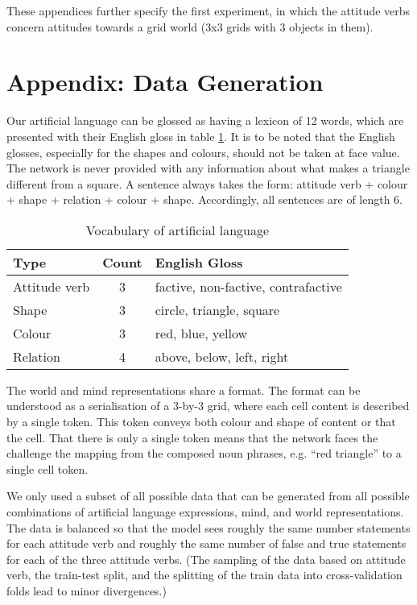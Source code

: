 \documentclass[a4paper]{article}
\begin{document}
These appendices further specify the first experiment, in which the
attitude verbs concern attitudes towards a grid world (3x3 grids with 3
objects in them).

\section{Appendix: Data Generation}

Our artificial language can be glossed as having a lexicon of 12 words, which are presented with their English gloss in table \ref{tab:artifical_vocabulary}. It is to be noted that the English glosses, especially for the shapes and colours, should not be taken at face value. The network is never provided with any information about what makes a triangle different from a square. A sentence always takes the form: attitude verb + colour + shape + relation + colour + shape. Accordingly, all sentences are of length 6.

\begin{table}[b]
    \centering
    \begin{tabular}{lcl}
        Type & Count & English Gloss \\ \hline
        Attitude verb & 3 & factive, non-factive, contrafactive \\
        Shape & 3 & circle, triangle, square \\
        Colour & 3 & red, blue, yellow \\
        Relation & 4 & above, below, left, right
    \end{tabular}
    \caption{Vocabulary of artificial language}
    \label{tab:artifical_vocabulary}
\end{table}

The world and mind representations share a format. The format can be understood as a serialisation of a 3-by-3 grid, where each cell content is described by a single token. This token conveys both colour and shape of content or that the cell. That there is only a single token means that the network faces the challenge the mapping from the composed noun phrases, e.g. ``red triangle'' to a single cell token.

We only used a subset of all possible data that can be generated from all possible combinations of artificial language expressions, mind, and world representations. The data is balanced so that the model sees roughly the same number statements for each attitude verb and roughly the same number of false and true statements for each of the three attitude verbs. (The sampling of the data based on attitude verb, the train-test split, and the splitting of the train data into cross-validation folds lead to minor divergences.)
\end{document}

